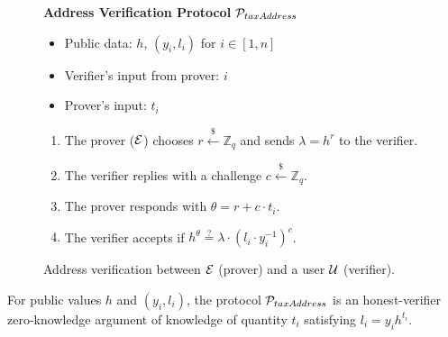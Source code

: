 \begin{figure}[h]
\begin{mdframed}

\begin{center}
    \textbf{Address Verification Protocol} $\mathcal{P}_{taxAddress}$
\end{center}

    \begin{itemize}
        \item Public data: $h$, $(y_i, l_i)$ for $i \in [1, n]$
        \item Verifier's input from prover: $i$
        \item Prover's input: $t_i$
    \end{itemize}

    \begin{enumerate}
        \item The prover ($\mathcal{E}$) chooses $r \xleftarrow{\$} \mathbb{Z}_q$
            and sends $\lambda = h^r$ to the verifier.
        \item The verifier replies with a challenge $c \xleftarrow{\$} \mathbb{Z}_q$.
        \item The prover responds with $\theta = r + c \cdot t_i$.
        \item The verifier accepts if $h^\theta \stackrel{?}{=} \lambda \cdot (l_i \cdot y_i^{-1})^c$.
    \end{enumerate}

\end{mdframed}
\caption{
    Address verification between $\mathcal{E}$ (prover) and a user $\mathcal{U}$ (verifier).
}
\label{fig:taxation_verification_proto}
\end{figure}

\begin{lemma}\label{thm:user-proto}
    For public values $h$ and $(y_i, l_i)$, the protocol
    $\mathcal{P}_{taxAddress}$ is an honest-verifier zero-knowledge argument of
    knowledge of quantity $t_i$ satisfying $l_i = y_ih^{t_i}$.
\end{lemma}

